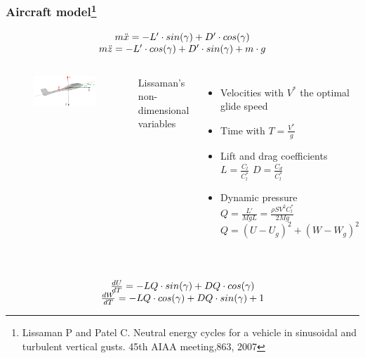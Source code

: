 \documentclass[compress]{beamer}
\begin{document}
\begin{frame}%
  \frametitle{Aircraft model\footnote{\tiny Lissaman P and Patel C. Neutral energy cycles for a vehicle in sinusoidal and turbulent vertical gusts. 45th AIAA meeting,863, 2007}}
  \begin{equation*}
    \begin{array}[c]{c}
      m \ddot{x} = -L' \cdot sin(\gamma) + D' \cdot cos(\gamma) \\
      m \ddot{z} = -L' \cdot cos(\gamma) + D' \cdot sin(\gamma) + m \cdot g
    \end{array}
  \end{equation*}
  \begin{columns}
    \begin{figure}[h]
      \centering
      \includegraphics[width=1\textwidth]{./Figures/glider.eps}
    \end{figure}
    Lissaman's non-dimensional variables
    \begin{itemize}
      \item Velocities with $V^{*}$ the optimal glide speed
      \item Time with $T=\frac{V^{*}}{g}$
      \item Lift and drag coefficients $L= \frac{C_l}{C_l^*}$ $D= \frac{C_d}{C_l^*}$
      \item Dynamic pressure $Q = \frac{L'}{MgL} = \frac{ \rho S V^{2} C_l^* }{2Mg}$ $Q=(U-U_g)^2+ (W-W_g)^2$
    \end{itemize}
  \end{columns}
  \begin{equation*}
    \begin{array}[c]{c}
      \\
      \frac{dU}{dT}= -LQ \cdot sin(\gamma) + DQ \cdot cos(\gamma) \\
      \frac{dW}{dT}= -LQ \cdot cos(\gamma) + DQ \cdot sin(\gamma) + 1
    \end{array}
  \end{equation*}
\end{frame}
\end{document}
